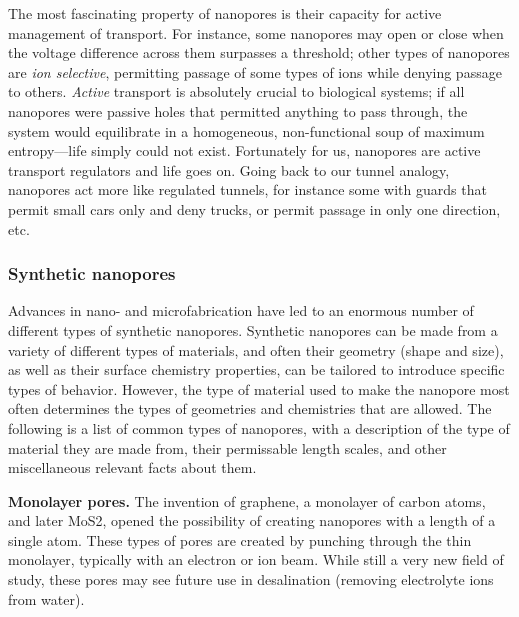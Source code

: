 \documentclass[a4paper,10pt]{article}
\theoremstyle{definition}
\theoremstyle{remark}
\begin{document}
The most fascinating property of nanopores is their capacity for active management of transport. For instance, some nanopores may open or close when the voltage difference across them surpasses a threshold; other types of nanopores are \textit{ion selective}, permitting passage of some types of ions while denying passage to others. \textit{Active} transport is absolutely crucial to biological systems; if all nanopores were passive holes that permitted anything to pass through, the system would equilibrate in a homogeneous, non-functional soup of maximum entropy---life simply could not exist. Fortunately for us, nanopores are active transport regulators and life goes on. Going back to our tunnel analogy, nanopores act more like regulated tunnels, for instance some with guards that permit small cars only and deny trucks, or permit passage in only one direction, etc.

\subsubsection{Synthetic nanopores}

Advances in nano- and microfabrication have led to an enormous number of different types of synthetic nanopores. Synthetic nanopores can be made from a variety of different types of materials, and often their geometry (shape and size), as well as their surface chemistry properties, can be tailored to introduce specific types of behavior. However, the type of material used to make the nanopore most often determines the types of geometries and chemistries that are allowed. The following is a list of common types of nanopores, with a description of the type of material they are made from, their permissable length scales, and other miscellaneous relevant facts about them.

\textbf{Monolayer pores.} The invention of graphene, a monolayer of carbon atoms, and later MoS2, opened the possibility of creating nanopores with a length of a single atom. These types of pores are created by punching through the thin monolayer, typically with an electron or ion beam. While still a very new field of study, these pores may see future use in desalination (removing electrolyte ions from water).
\end{document}
